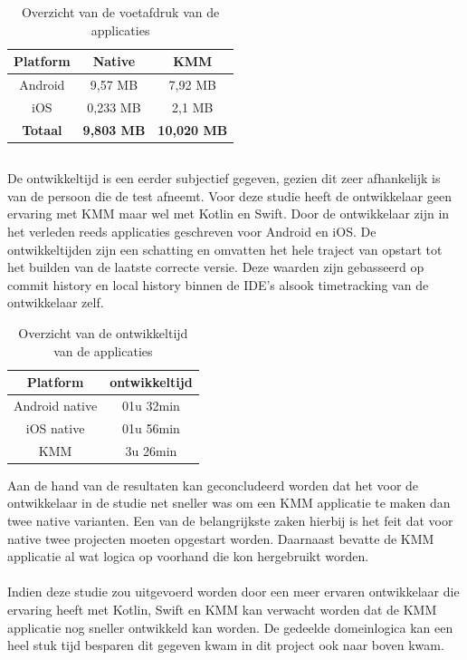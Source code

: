 \begin{table}[H]
    \centering
    \caption{Overzicht van de voetafdruk van de applicaties}
    \begin{tabular}{|c|c|c|}
        \hline
        {\textbf{Platform}} & {\textbf{Native}}  & {\textbf{KMM}}\\ \hline \hline
        Android&9,57 MB&7,92 MB\\ \hline
        iOS&0,233 MB&2,1 MB\\ \hline \hline
        \textbf{Totaal}&\textbf{9,803 MB}&\textbf{10,020 MB}\\ \hline
    \end{tabular}
    \label{T:voetafruk-overzicht}
\end{table}

\subsection{}
\label{sec:M-test-ontwikkeltijd}
De ontwikkeltijd is een eerder subjectief gegeven, gezien dit zeer afhankelijk is van de persoon die de test afneemt. Voor deze studie heeft de ontwikkelaar geen ervaring met KMM maar wel met Kotlin en Swift. Door de ontwikkelaar zijn in het verleden reeds applicaties geschreven voor Android en iOS. De ontwikkeltijden zijn een schatting en omvatten het hele traject van opstart tot het builden van de laatste correcte versie. Deze waarden zijn gebasseerd op commit history en local history binnen de IDE's alsook timetracking van de ontwikkelaar zelf.

\begin{table}[H]
    \centering
    \caption{Overzicht van de ontwikkeltijd van de applicaties}
    \begin{tabular}{|c|c|}
        \hline
        {\textbf{Platform}} & {\textbf{ontwikkeltijd}}\\ \hline \hline
        Android native&01u 32min\\ \hline
        iOS native&01u 56min\\ \hline
        KMM&3u 26min\\ \hline
    \end{tabular}
    \label{T:ontwikkeltijd-overzicht}
\end{table}

Aan de hand van de resultaten kan geconcludeerd worden dat het voor de ontwikkelaar in de studie net sneller was om een KMM applicatie te maken dan twee native varianten. Een van de belangrijkste zaken hierbij is het feit dat voor native twee projecten moeten opgestart worden. Daarnaast bevatte de KMM applicatie al wat logica op voorhand die kon hergebruikt worden.
\\ \\ 
Indien deze studie zou uitgevoerd worden door een meer ervaren ontwikkelaar die ervaring heeft met Kotlin, Swift en KMM kan verwacht worden dat de KMM applicatie nog sneller ontwikkeld kan worden. De gedeelde domeinlogica kan een heel stuk tijd besparen dit gegeven kwam in dit project ook naar boven kwam.

